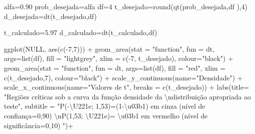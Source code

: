\documentclass[
]{book}
\newenvironment{Shaded}{\begin{snugshade}}{\end{snugshade}}
\newcommand{\AttributeTok}[1]{\textcolor[rgb]{0.77,0.63,0.00}{#1}}
\newcommand{\ConstantTok}[1]{\textcolor[rgb]{0.00,0.00,0.00}{#1}}
\newcommand{\DecValTok}[1]{\textcolor[rgb]{0.00,0.00,0.81}{#1}}
\newcommand{\FloatTok}[1]{\textcolor[rgb]{0.00,0.00,0.81}{#1}}
\newcommand{\FunctionTok}[1]{\textcolor[rgb]{0.00,0.00,0.00}{#1}}
\newcommand{\NormalTok}[1]{#1}
\newcommand{\OtherTok}[1]{\textcolor[rgb]{0.56,0.35,0.01}{#1}}
\newcommand{\SpecialCharTok}[1]{\textcolor[rgb]{0.00,0.00,0.00}{#1}}
\newcommand{\StringTok}[1]{\textcolor[rgb]{0.31,0.60,0.02}{#1}}
\begin{document}
\begin{Shaded}
\begin{Highlighting}[]
\NormalTok{alfa}\OtherTok{=}\FloatTok{0.90}
\NormalTok{prob\_desejada}\OtherTok{=}\NormalTok{alfa}
\NormalTok{df}\OtherTok{=}\DecValTok{4}
\NormalTok{t\_desejado}\OtherTok{=}\FunctionTok{round}\NormalTok{(}\FunctionTok{qt}\NormalTok{(prob\_desejada,df ),}\DecValTok{4}\NormalTok{)}
\NormalTok{d\_desejada}\OtherTok{=}\FunctionTok{dt}\NormalTok{(t\_desejado,df)}

\NormalTok{t\_calculado}\OtherTok{=}\FloatTok{5.97}
\NormalTok{d\_calculado}\OtherTok{=}\FunctionTok{dt}\NormalTok{(t\_calculado,df)}


\FunctionTok{ggplot}\NormalTok{(}\ConstantTok{NULL}\NormalTok{, }\FunctionTok{aes}\NormalTok{(}\FunctionTok{c}\NormalTok{(}\SpecialCharTok{{-}}\DecValTok{7}\NormalTok{,}\DecValTok{7}\NormalTok{))) }\SpecialCharTok{+}
  \FunctionTok{geom\_area}\NormalTok{(}\AttributeTok{stat =} \StringTok{"function"}\NormalTok{, }
            \AttributeTok{fun =}\NormalTok{ dt,}
            \AttributeTok{args=}\FunctionTok{list}\NormalTok{(df), }
            \AttributeTok{fill =} \StringTok{"lightgrey"}\NormalTok{, }
            \AttributeTok{xlim =} \FunctionTok{c}\NormalTok{(}\SpecialCharTok{{-}}\DecValTok{7}\NormalTok{, t\_desejado),}
            \AttributeTok{colour=}\StringTok{"black"}\NormalTok{) }\SpecialCharTok{+}
  \FunctionTok{geom\_area}\NormalTok{(}\AttributeTok{stat =} \StringTok{"function"}\NormalTok{, }
            \AttributeTok{fun =}\NormalTok{ dt, }
            \AttributeTok{args=}\FunctionTok{list}\NormalTok{(df), }
            \AttributeTok{fill =} \StringTok{"red"}\NormalTok{, }
            \AttributeTok{xlim =} \FunctionTok{c}\NormalTok{(t\_desejado,}\DecValTok{7}\NormalTok{),}
            \AttributeTok{colour=}\StringTok{"black"}\NormalTok{) }\SpecialCharTok{+}
  \FunctionTok{scale\_y\_continuous}\NormalTok{(}\AttributeTok{name=}\StringTok{"Densidade"}\NormalTok{) }\SpecialCharTok{+}
  \FunctionTok{scale\_x\_continuous}\NormalTok{(}\AttributeTok{name=}\StringTok{"Valores de t"}\NormalTok{, }\AttributeTok{breaks =} \FunctionTok{c}\NormalTok{(t\_desejado))  }\SpecialCharTok{+}
  \FunctionTok{labs}\NormalTok{(}\AttributeTok{title=} 
         \StringTok{"Regiões críticas sob a curva da função densidade da }\SpecialCharTok{\textbackslash{}n}\StringTok{distribuição apropriada ao teste"}\NormalTok{, }
       \AttributeTok{subtitle =} \StringTok{"P({-}\textbackslash{}U221e; 1,53)=(1{-}\textbackslash{}u03b1) em cinza (nível de confiança=0,90) }\SpecialCharTok{\textbackslash{}n}\StringTok{P(1,53; \textbackslash{}U221e)= \textbackslash{}u03b1 em vermelho (nível de significância=0,10) "}\NormalTok{)}\SpecialCharTok{+} 

\end{Highlighting}
\end{Shaded}
\end{document}
